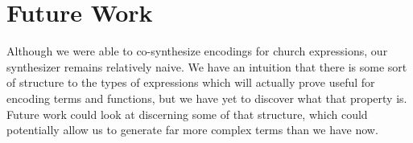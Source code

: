 \section{Future Work}
Although we were able to co-synthesize encodings for church expressions,
  our synthesizer remains relatively naive.
We have an intuition that there is some sort of structure to the types
  of expressions which will actually prove useful for encoding terms
  and functions, but we have yet to discover what that property is.
Future work could look at discerning some of that structure, which could
  potentially allow us to generate far more complex terms than we have now.

